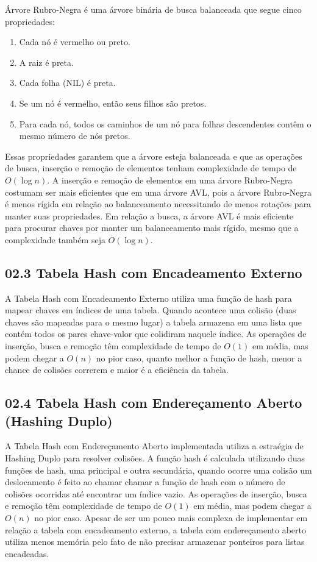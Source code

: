 \documentclass{article}
\begin{document}
Árvore Rubro-Negra é uma árvore binária de busca balanceada que segue cinco propriedades:
\begin{enumerate}
    \item Cada nó é vermelho ou preto.
    \item A raiz é preta.
    \item Cada folha (NIL) é preta.
    \item Se um nó é vermelho, então seus filhos são pretos.
    \item Para cada nó, todos os caminhos de um nó para folhas descendentes contêm o mesmo número de nós pretos.
\end{enumerate}
Essas propriedades garantem que a árvore esteja balanceada e que as operações de busca, inserção e remoção de elementos tenham complexidade de tempo de \(\displaystyle O(\log n)\).
A inserção e remoção de elementos em uma árvore Rubro-Negra costumam ser mais eficientes que em uma árvore AVL, pois a árvore Rubro-Negra é menos rígida em relação ao balanceamento necessitando de menos rotações para manter suas propriedades.
Em relação a busca, a árvore AVL é mais eficiente para procurar chaves por manter um balanceamento mais rígido, mesmo que a complexidade também seja \(\displaystyle O(\log n)\).

\subsection*{02.3 Tabela Hash com Encadeamento Externo}

A Tabela Hash com Encadeamento Externo utiliza uma função de hash para mapear chaves em índices de uma tabela. Quando acontece uma colisão
(duas chaves são mapeadas para o mesmo lugar) a tabela armazena em uma lista que contém todos os pares chave-valor que colidiram naquele índice. 
As operações de inserção, busca e remoção têm complexidade de tempo de \(\displaystyle O(1)\) em média, mas podem chegar a \(\displaystyle O(n)\) no pior caso,
quanto melhor  a função de hash, menor a chance de colisões correrem e maior é a eficiência da tabela.


\subsection*{02.4 Tabela Hash com Endereçamento Aberto (Hashing Duplo)}
A Tabela Hash com Endereçamento Aberto implementada utiliza a estraégia de Hashing Duplo para resolver colisões.
A função hash é calculada utilizando duas funções de hash, uma principal e outra secundária, quando ocorre uma colisão um deslocamento 
é feito ao chamar chamar a função de hash com o número de colisões ocorridas até encontrar um índice vazio.
As operações de inserção, busca e remoção têm complexidade de tempo de \(\displaystyle O(1)\) em média, mas podem chegar a \(\displaystyle O(n)\) no pior caso. Apesar de ser um pouco mais complexa de implementar em relação a tabela com encadeamento externo, a tabela com endereçamento aberto utiliza menos memória pelo fato de não precisar armazenar ponteiros para listas encadeadas.
\end{document}

